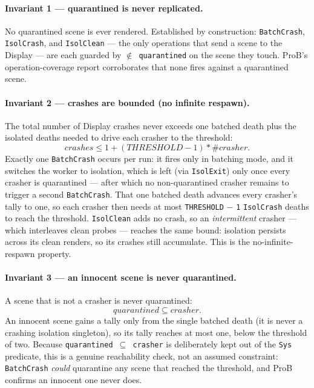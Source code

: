 \documentclass[a4paper,10pt,fleqn]{article}
\begin{document}
\paragraph{Invariant 1 --- quarantined is never replicated.}
No quarantined scene is ever rendered.  Established by construction:
\texttt{BatchCrash}, \texttt{IsolCrash}, and \texttt{IsolClean} --- the only
operations that send a scene to the Display --- are each guarded by
\texttt{$\notin$ quarantined} on the scene they touch.  ProB's operation-coverage
report corroborates that none fires against a quarantined scene.

\paragraph{Invariant 2 --- crashes are bounded (no infinite respawn).}
The total number of Display crashes never exceeds one batched death plus the
isolated deaths needed to drive each crasher to the threshold:
\[
  crashes \leq 1 + (THRESHOLD - 1) * \# crasher.
\]
Exactly one \texttt{BatchCrash} occurs per run: it fires only in batching mode,
and it switches the worker to isolation, which is left (via \texttt{IsolExit})
only once every crasher is quarantined --- after which no non-quarantined crasher
remains to trigger a second \texttt{BatchCrash}.  That one batched death advances
every crasher's tally to one, so each crasher then needs at most
\texttt{THRESHOLD} $-$ \texttt{1} \texttt{IsolCrash} deaths to reach the
threshold.  \texttt{IsolClean} adds no crash, so an \emph{intermittent} crasher
--- which interleaves clean probes --- reaches the same bound: isolation persists
across its clean renders, so its crashes still accumulate.  This is the
no-infinite-respawn property.

\paragraph{Invariant 3 --- an innocent scene is never quarantined.}
A scene that is not a crasher is never quarantined:
\[
  quarantined \subseteq crasher.
\]
An innocent scene gains a tally only from the single batched death (it is never a
crashing isolation singleton), so its tally reaches at most one, below the
threshold of two.  Because \texttt{quarantined $\subseteq$ crasher} is deliberately
kept out of the \texttt{Sys} predicate, this is a genuine reachability check, not
an assumed constraint: \texttt{BatchCrash} \emph{could} quarantine any scene that
reached the threshold, and ProB confirms an innocent one never does.
\end{document}
